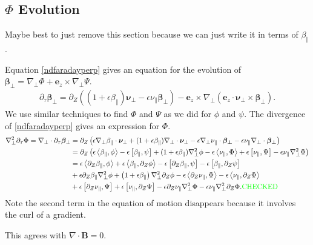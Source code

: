 \documentclass{article}
\newcommand{\para}{\parallel}
\newcommand{\ep}{\epsilon}
\newcommand{\np}{\nabla_\perp}
\newcommand{\p}{\partial}
\newcommand{\pth} [1] {\left( #1 \right) }
\newcommand{\br} [1] {\left[ #1 \right] }
\begin{document}
\subsection{$\Phi$ Evolution}
Maybe best to just remove this section because we can just write it in terms of $\beta_\para$. 

Equation \eqref{ndfaradayperp} gives an equation for the evolution of $\bm{\beta}_\perp = \np\Phi + \bm{e}_z\times\np\Psi$. 
\begin{align*} 
    \p_\tau\bm{\beta}_\perp = \p_Z \pth{\pth{1+\ep\beta_\para} \bm{\nu}_\perp - \ep\nu_\para \bm{\beta}_\perp} - \bm{e}_z \times \np \pth{\bm{e}_z \cdot \bm{\nu}_\perp \times \bm{\beta}_\perp}. 
\end{align*}
We use similar techniques to find $\Phi$ and $\Psi$ as we did for $\phi$ and $\psi$. The divergence of \eqref{ndfaradayperp} gives an expression for $\Phi$. 
\begin{align} \label{Phievolution} 
    \np^2\p_\tau\Phi = \np\cdot\p_\tau\bm{\beta}_\perp &= \p_Z \pth{\ep\np\beta_\para\cdot\bm{\nu}_\perp + (1+\ep\beta_\para) \np\cdot\bm{\nu}_\perp - \ep\np\nu_\para\cdot\bm{\beta_\perp} - \ep\nu_\para\np\cdot\bm{\beta_\perp}} \nonumber\\ 
    &= \p_Z\pth{\ep\Braket{\beta_\para, \phi} - \ep\br{\beta_\para, \psi} + (1+\ep\beta_\para) \np^2\phi - \ep\Braket{\nu_\para, \Phi} + \ep\br{\nu_\para, \Psi} -\ep\nu_\para\np^2\Phi} \nonumber\\ 
        &= \ep\Braket{\p_Z\beta_\para, \phi} + \ep\Braket{\beta_\para, \p_Z\phi} - \ep\br{\p_Z\beta_\para, \psi} - \ep\br{\beta_\para, \p_Z\psi} \nonumber\\ 
        &+ \ep\p_Z\beta_\para\np^2\phi + \pth{1+\ep\beta_\para}\np^2\p_Z\phi - \ep\Braket{\p_Z\nu_\para, \Phi} - \ep\Braket{\nu_\para, \p_Z\Phi} \nonumber\\ 
        &+ \ep\br{\p_Z\nu_\para, \Psi} + \ep\br{\nu_\para, \p_Z\Psi} - \ep\p_Z\nu_\para\np^2\Phi - \ep\nu_\para\np^2\p_Z\Phi. \text{\color{green}CHECKED} 
\end{align}
Note the second term in the equation of motion disappears because it involves the curl of a gradient. 

This agrees with $\nabla\cdot\bm{B}=0$. 
\end{document}
